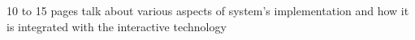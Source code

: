 10 to 15 pages
talk about various aspects of system's implementation and 
how it is integrated with the interactive technology